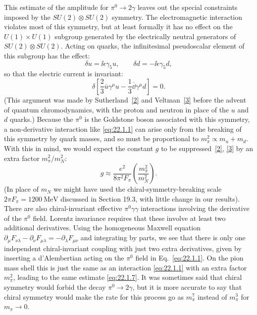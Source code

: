 This estimate of the amplitude for $\pi^0\to2\gamma$ leaves out the special
constraints imposed by the $SU(2)\otimes SU(2)$ symmetry. The electromagnetic
interaction violates most of this symmetry, but at least formally it has no
effect on the $U(1)\times U(1)$ subgroup generated by the electrically
neutral generators of $SU(2)\otimes SU(2)$. Acting on quarks, the
infinitesimal pseudoscalar element of this subgroup has the effect:
\begin{equation}
 \delta u=\ii\epsilon\gamma_5u,\qquad
 \delta d=-\ii\epsilon\gamma_5d,
 \tag{22.1.5}\label{eq:22.1.5}
\end{equation}
so that the electric current is invariant:
\begin{equation}
 \delta\left[
  \frac{2}{3}\overline u\gamma^\mu u
  -\frac{1}{3}\overline \dd\gamma^\mu d
 \right]=0.
 \tag{22.1.6}\label{eq:22.1.6}
\end{equation}
(This argument was made by Sutherland~\hyperref[ch22-ref-2]{[2]} and
Veltman~\hyperref[ch22-ref-3]{[3]} before the advent of quantum
chromodynamics, with the proton and neutron in place of the $u$ and $d$
quarks.) Because the $\pi^0$ is the Goldstone boson associated with this
symmetry, a non-derivative interaction like \eqref{eq:22.1.1} can arise only
from the breaking of this symmetry by quark masses, and so must be
proportional to $m_\pi^2\propto m_u+m_d$. With this in mind, we would expect
the constant $g$ to be suppressed~\hyperref[ch22-ref-2]{[2]},
\hyperref[ch22-ref-3]{[3]} by an extra factor $m_\pi^2/m_N^2$:
\begin{equation}
 g\approx\frac{e^2}{8\pi^2F_\pi}
 \left(\frac{m_\pi^2}{m_N^2}\right).
 \tag{22.1.7}\label{eq:22.1.7}
\end{equation}
(In place of $m_N$ we might have used the chiral-symmetry-breaking scale
$2\pi F_\pi=1200\ \mathrm{MeV}$ discussed in Section 19.3, with little
change in our results). There are also chiral-invariant effective
$\pi^0\gamma\gamma$ interactions involving the derivative of the $\pi^0$
field. Lorentz invariance requires that these involve at least two
additional derivatives. Using the homogeneous Maxwell equation
$\partial_\mu F_{\nu\lambda}-\partial_\nu F_{\mu\lambda}
=-\partial_\lambda F_{\mu\nu}$ and integrating by parts, we see that there
is only one independent chiral-invariant coupling with just two extra
derivatives, given by inserting a d'Alembertian acting on the $\pi^0$ field
in Eq.~\eqref{eq:22.1.1}. On the pion mass shell this is just the same as an
interaction \eqref{eq:22.1.1} with an extra factor $m_\pi^2$, leading to the
same estimate \eqref{eq:22.1.7}. It was sometimes said that chiral symmetry
would forbid the decay $\pi^0\to2\gamma$, but it is more accurate to say
that chiral symmetry would make the rate for this process go as $m_\pi^7$
instead of $m_\pi^3$ for $m_\pi\to0$.

